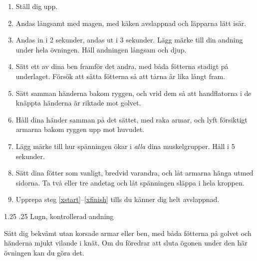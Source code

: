 \documentclass[swedish,a4paper]{book}
\makeatletter
\renewcommand\section{\@startsection{section}{1}{\z@}%
                                   {1.25\baselineskip}%
                                   {.25\baselineskip}%
                                   {\fontsize{1.25\baselineskip}{1.25\baselineskip}\selectfont\sffamily\bfseries}} %
\makeatother
\begin{document}
\begin{enumerate}

\item 
Ställ dig upp.

\item
Andas långsamt med magen, med käken avslappnad och läpparna lätt isär.

\item 
Andas in i 2 sekunder, andas ut i 3 sekunder. Lägg märke till din andning under hela övningen. Håll andningen långsam och djup.

\item
\label{xstart}Sätt ett av dina ben framför det andra, med båda fötterna stadigt på underlaget. Försök att sätta fötterna så att tårna är lika långt fram.

\item
Sätt samman händerna bakom ryggen, och vrid dem så att handflatorna i de knäppta händerna är riktade mot golvet.

\item
Håll dina händer samman på det sättet, med raka armar, och lyft försiktigt armarna bakom ryggen upp mot huvudet.

\item
Lägg märke till hur spänningen ökar i \textit{alla} dina muskelgrupper. Håll i 5 sekunder.

\item
\label{xfinish}Sätt dina fötter som vanligt, bredvid varandra, och låt armarna hänga utmed sidorna. Ta två eller tre andetag och låt spänningen släppa i hela kroppen.

\item
Upprepa steg \ref{xstart}--\ref{xfinish} tills du känner dig helt avslappnad.

\end{enumerate}

\section{Lugn, kontrollerad andning}

Sätt dig bekvämt utan korsade armar eller ben, med båda fötterna på golvet och händerna mjukt vilande i knät. Om du föredrar att sluta ögonen under den här övningen kan du göra det.
\end{document}
